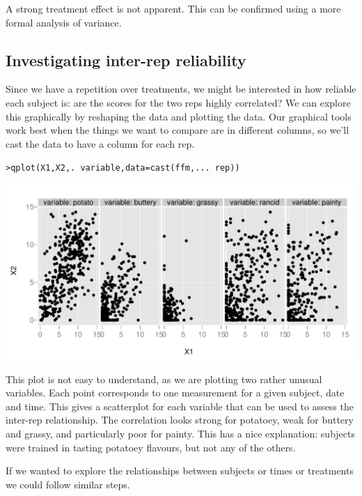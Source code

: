 \documentclass[oneside,letterpaper]{scrartcl}
\begin{document}
A strong treatment effect is not apparent. This can be confirmed using a more formal analysis of variance.

\subsection{Investigating inter-rep reliability}\label{sub:investigation_inter_rep_reliability}

Since we have a repetition over treatments, we might be interested in how reliable each subject is: are the scores for the two reps highly correlated?  We can explore this graphically by reshaping the data and plotting the data.  Our graphical tools work best when the things we want to compare are in different columns, so we'll cast the data to have a column for each rep.

\begin{alltt}
> qplot(X1, X2, . ~ variable, data = cast(ffm, ... ~ rep))
\end{alltt}
\includegraphics[scale=1]{./include/3416a75f4cea9109507cacd8e2f2aefc-001.pdf}
\begin{alltt}

\end{alltt}

This plot is not easy to understand, as we are plotting two rather unusual variables.  Each point corresponds to one measurement for a given subject, date and time.  This gives a scatterplot for each variable that can be used to assess the inter-rep relationship.  The correlation looks strong for potatoey, weak for buttery and grassy, and particularly poor for painty.  This has a nice explanation: subjects were trained in tasting potatoey flavours, but not any of the others.

If we wanted to explore the relationships between subjects or times or treatments we could follow similar steps.
\end{document}
